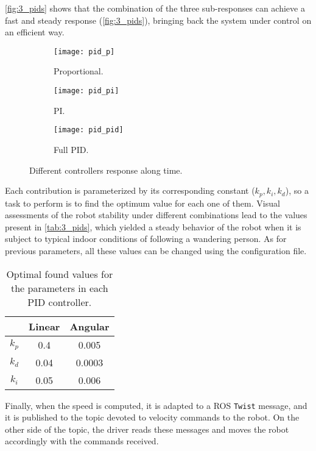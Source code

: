 \autoref{fig:3_pids} shows that the combination of the three sub-responses can achieve a fast and steady response (\autoref{fig:3_pids}), bringing back the system under control on an efficient way.

\begin{figure}[h]
	\centering
	\begin{subfigure}[b]{0.3\linewidth}
		\centering
		\texttt{[image: pid\_p]}
		\caption{Proportional.}
		\label{fig:3_pid_p}
	\end{subfigure}
	\hfill
	\begin{subfigure}[b]{0.3\linewidth}
		\centering
		\texttt{[image: pid\_pi]}
		\caption{PI.}
		\label{fig:3_pid_pi}
	\end{subfigure}
	\hfill
	\begin{subfigure}[b]{0.3\linewidth}
		\centering
		\texttt{[image: pid\_pid]}
		\caption{Full PID.}
		\label{fig:3_pid_pid}
	\end{subfigure}
	\caption{Different controllers response along time.}
	\label{fig:3_pids}		 	
\end{figure}

Each contribution is parameterized by its corresponding constant ($k_p, k_i, k_d$), so a task to perform is to find the optimum value for each one of them. Visual assessments of the robot stability under different combinations lead to the values present in \autoref{tab:3_pids}, which yielded a steady behavior of the robot when it is subject to typical indoor conditions of following a wandering person. As for previous parameters, all these values can be changed using the configuration file.

\begin{table}[h]
	\centering
	\begin{tabular}{|c|c|c|}
		\hline
		\textbf{} & \textbf{Linear} & \textbf{Angular} \\ \hline
		$k_p$     & 0.4               & 0.005               \\ \hline
		$k_d$     & 0.04              & 0.0003              \\ \hline
		$k_i$     & 0.05              & 0.006               \\ \hline
	\end{tabular}
	\caption{Optimal found values for the parameters in each PID controller.}
	\label{tab:3_pids}
\end{table}

Finally, when the speed is computed, it is adapted to a ROS \texttt{Twist} message, and it is published to the topic devoted to velocity commands to the robot. On the other side of the topic, the driver reads these messages and moves the robot accordingly with the commands received.\\


